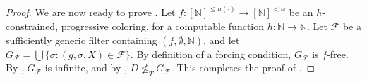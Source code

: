 \documentclass[10pt,a4paper]{article}
\def\F{\mathcal{F}}
\newcommand{\NN}[0]{\mathbb{N}}
\numberwithin{theorem}{section}
\begin{document}
\begin{proof}
We are now ready to prove .
Let $f : [\NN]^{\leq h(\cdot)} \to [\NN]^{<\omega}$ be an $h$-constrained, progressive coloring, for a computable function $h : \NN \to \NN$.
Let $\F$ be a sufficiently generic filter containing $(f, \emptyset, \NN)$,
and let $G_\F = \bigcup \{ \sigma : (g, \sigma, X) \in \F \}$. By definition of a forcing condition, $G_\F$ is $f$-free. By , $G_\F$ is infinite, and by , $D \not \leq_T G_\F$.
This completes the proof of .
\end{proof}



\end{document}
